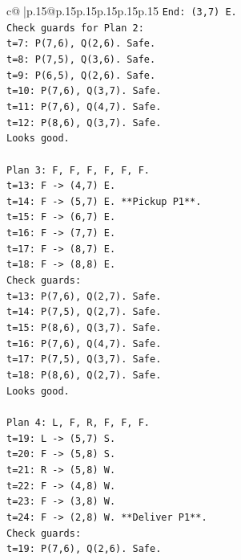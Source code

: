 \documentclass{article}
\begin{document}
{\begin{supertabular}{c@{$\;$}|p{.15\linewidth}@{}p{.15\linewidth}p{.15\linewidth}p{.15\linewidth}p{.15\linewidth}p{.15\linewidth}}
{{{\texttt{End: (3,7) E.} \\
\texttt{Check guards for Plan 2:} \\
\texttt{t=7: P(7,6), Q(2,6). Safe.} \\
\texttt{t=8: P(7,5), Q(3,6). Safe.} \\
\texttt{t=9: P(6,5), Q(2,6). Safe.} \\
\texttt{t=10: P(7,6), Q(3,7). Safe.} \\
\texttt{t=11: P(7,6), Q(4,7). Safe.} \\
\texttt{t=12: P(8,6), Q(3,7). Safe.} \\
\texttt{Looks good.} \\
\\ 
\texttt{Plan 3: F, F, F, F, F, F.} \\
\texttt{t=13: F {-}> (4,7) E.} \\
\texttt{t=14: F {-}> (5,7) E. **Pickup P1**.} \\
\texttt{t=15: F {-}> (6,7) E.} \\
\texttt{t=16: F {-}> (7,7) E.} \\
\texttt{t=17: F {-}> (8,7) E.} \\
\texttt{t=18: F {-}> (8,8) E.} \\
\texttt{Check guards:} \\
\texttt{t=13: P(7,6), Q(2,7). Safe.} \\
\texttt{t=14: P(7,5), Q(2,7). Safe.} \\
\texttt{t=15: P(8,6), Q(3,7). Safe.} \\
\texttt{t=16: P(7,6), Q(4,7). Safe.} \\
\texttt{t=17: P(7,5), Q(3,7). Safe.} \\
\texttt{t=18: P(8,6), Q(2,7). Safe.} \\
\texttt{Looks good.} \\
\\ 
\texttt{Plan 4: L, F, R, F, F, F.} \\
\texttt{t=19: L {-}> (5,7) S.} \\
\texttt{t=20: F {-}> (5,8) S.} \\
\texttt{t=21: R {-}> (5,8) W.} \\
\texttt{t=22: F {-}> (4,8) W.} \\
\texttt{t=23: F {-}> (3,8) W.} \\
\texttt{t=24: F {-}> (2,8) W. **Deliver P1**.} \\
\texttt{Check guards:} \\
\texttt{t=19: P(7,6), Q(2,6). Safe.} \\
}}}
\end{supertabular}}
\end{document}
